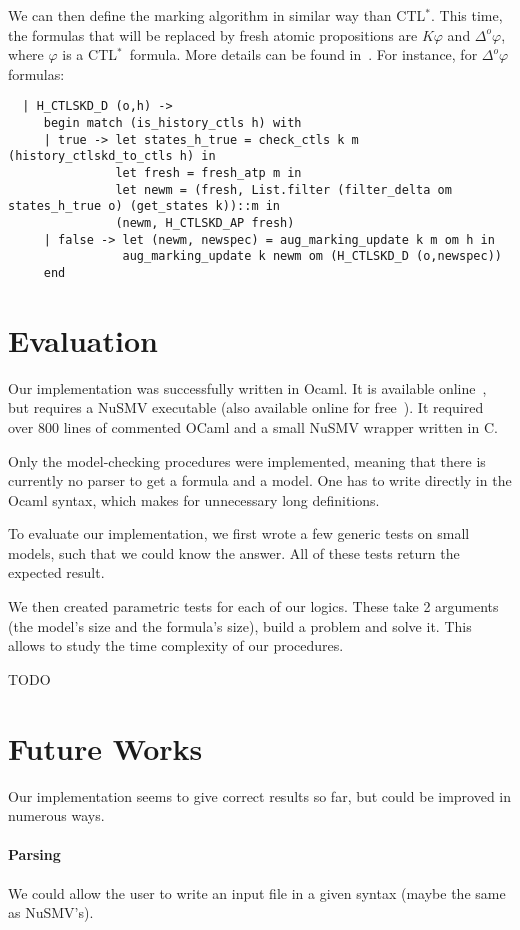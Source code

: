 \documentclass[dvipsnames]{acmart}
\def\ctls{CTL$^{*}$}
\def\K{\mathit{K}}
\def\D#1{\Delta^{#1}}
\begin{document}
We can then define the marking algorithm in similar way than \ctls. This time, the formulas that will be replaced by fresh atomic propositions are $\K\varphi$ and $\D{o}\varphi$, where $\varphi$ is a \ctls\ formula. More details can be found in~\cite{internship}.
For instance, for $\D{o}\varphi$ formulas:
\begin{lstlisting}
  | H_CTLSKD_D (o,h) ->
     begin match (is_history_ctls h) with
     | true -> let states_h_true = check_ctls k m (history_ctlskd_to_ctls h) in
               let fresh = fresh_atp m in
               let newm = (fresh, List.filter (filter_delta om states_h_true o) (get_states k))::m in
               (newm, H_CTLSKD_AP fresh)
     | false -> let (newm, newspec) = aug_marking_update k m om h in
                aug_marking_update k newm om (H_CTLSKD_D (o,newspec))
     end
\end{lstlisting}


\section{Evaluation}
Our implementation was successfully written in Ocaml. It is available online~\cite{ctlskd_mc}, but requires a NuSMV executable (also available online for free~\cite{get_nusmv}). It required over 800 lines of commented OCaml and a small NuSMV wrapper written in C.

Only the model-checking procedures were implemented, meaning that there is currently no parser to get a formula and a model. One has to write directly in the Ocaml syntax, which makes for unnecessary long definitions.

To evaluate our implementation, we first wrote a few generic tests on small models, such that we could know the answer.
All of these tests return the expected result.

We then created parametric tests for each of our logics. These take 2 arguments (the model's size and the formula's size), build a problem and solve it. This allows to study the time complexity of our procedures.

TODO

\section{Future Works}
Our implementation seems to give correct results so far, but could be improved in numerous ways.

\paragraph{Parsing}
We could allow the user to write an input file in a given syntax (maybe the same as NuSMV's).
\end{document}
